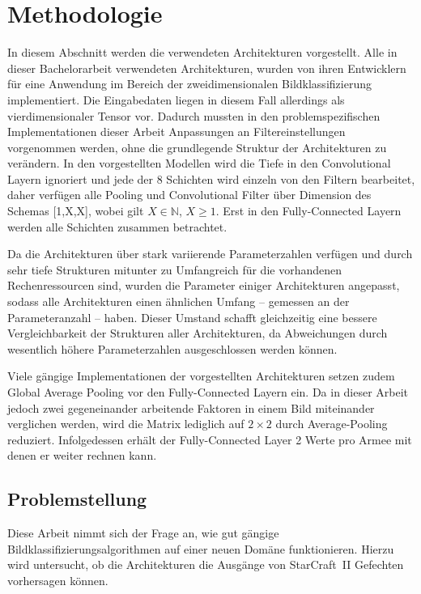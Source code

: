 \section{Methodologie}
\label{Meth}

In diesem Abschnitt werden die verwendeten Architekturen vorgestellt. Alle in dieser Bachelorarbeit verwendeten Architekturen, wurden von ihren Entwicklern für eine Anwendung im Bereich der zweidimensionalen Bildklassifizierung implementiert. Die Eingabedaten liegen in diesem Fall allerdings als vierdimensionaler Tensor vor. Dadurch mussten in den problemspezifischen Implementationen dieser Arbeit Anpassungen an Filtereinstellungen vorgenommen werden, ohne die grundlegende Struktur der Architekturen zu verändern. In den vorgestellten Modellen wird die Tiefe in den Convolutional Layern ignoriert und jede der 8 Schichten wird einzeln von den Filtern bearbeitet, daher verfügen alle Pooling und Convolutional Filter über Dimension des Schemas [1,X,X], wobei gilt $X \in \mathbb{N}$, $X \geq 1$. Erst in den Fully-Connected Layern werden alle Schichten zusammen betrachtet. 

Da die Architekturen über stark variierende Parameterzahlen verfügen und durch sehr tiefe Strukturen mitunter zu Umfangreich für die vorhandenen Rechenressourcen sind, wurden die Parameter einiger Architekturen angepasst, sodass alle Architekturen einen ähnlichen Umfang -- gemessen an der Parameteranzahl -- haben. Dieser Umstand schafft gleichzeitig eine bessere Vergleichbarkeit der Strukturen aller Architekturen, da Abweichungen durch wesentlich höhere Parameterzahlen ausgeschlossen werden können. 

Viele gängige Implementationen der vorgestellten Architekturen setzen zudem Global Average Pooling vor den Fully-Connected Layern ein. Da in dieser Arbeit jedoch zwei gegeneinander arbeitende Faktoren in einem Bild miteinander verglichen werden, wird die Matrix lediglich auf $2 \times 2$ durch Average-Pooling reduziert. Infolgedessen erhält der Fully-Connected Layer 2 Werte pro Armee mit denen er weiter rechnen kann. 
 
\subsection{Problemstellung}
Diese Arbeit nimmt sich der Frage an, wie gut gängige Bildklassifizierungsalgorithmen auf einer neuen Domäne funktionieren. Hierzu wird untersucht, ob die Architekturen die Ausgänge von StarCraft~II Gefechten vorhersagen können.

